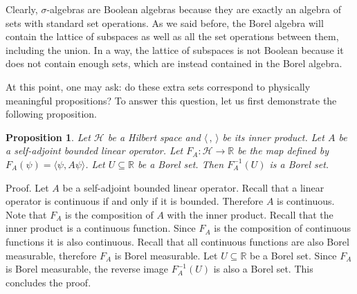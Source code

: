 \documentclass[11pt, executivepaper]{article}
\newtheorem{prop}{Proposition}
\begin{document}
Clearly, $\sigma$-algebras are Boolean algebras because they are exactly an algebra of sets with standard set operations. As we said before, the Borel algebra will contain the lattice of subspaces as well as all the set operations between them, including the union. In a way, the lattice of subspaces is not Boolean because it does not contain enough sets, which are instead contained in the Borel algebra.

At this point, one may ask: do these extra sets correspond to physically meaningful propositions? To answer this question, let us first demonstrate the following proposition.

\begin{prop}
	Let $\mathcal{H}$ be a Hilbert space and $\langle \, , \, \rangle$ be its inner product. Let $A$ be a self-adjoint bounded linear operator. Let $F_A : \mathcal{H} \to \mathbb{R}$ be the map defined by $F_A(\psi) = \langle \psi , A \psi \rangle$. Let $U \subseteq \mathbb{R}$ be a Borel set. Then $F_A^{-1}(U)$ is a Borel set.
\end{prop}

Proof. Let $A$ be a self-adjoint bounded linear operator. Recall that a linear operator is continuous if and only if it is bounded. Therefore $A$ is continuous. Note that $F_A$ is the composition of $A$ with the inner product. Recall that the inner product is a continuous function. Since $F_A$ is the composition of continuous functions it is also continuous. Recall that all continuous functions are also Borel measurable, therefore $F_A$ is Borel measurable. Let $U \subseteq \mathbb{R}$ be a Borel set. Since $F_A$ is Borel measurable, the reverse image $F_A^{-1}(U)$ is also a Borel set. This concludes the proof.
\end{document}
